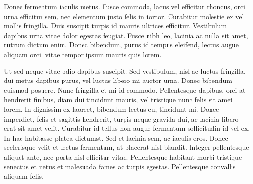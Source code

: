 Donec fermentum iaculis metus. Fusce commodo, lacus vel efficitur rhoncus, orci urna efficitur sem, nec elementum justo felis in tortor. Curabitur molestie ex vel mollis fringilla. Duis suscipit turpis id mauris ultrices efficitur. Vestibulum dapibus urna vitae dolor egestas feugiat. Fusce nibh leo, lacinia ac nulla sit amet, rutrum dictum enim. Donec bibendum, purus id tempus eleifend, lectus augue aliquam orci, vitae tempor ipsum mauris quis lorem.

Ut sed neque vitae odio dapibus suscipit. Sed vestibulum, nisl ac luctus fringilla, dui metus dapibus purus, vel luctus libero mi auctor urna. Donec bibendum euismod posuere. Nunc fringilla et mi id commodo. Pellentesque dapibus, orci at hendrerit finibus, diam dui tincidunt mauris, vel tristique nunc felis sit amet lorem. In dignissim ex laoreet, bibendum lectus eu, tincidunt mi. Donec imperdiet, felis et sagittis hendrerit, turpis neque gravida dui, ac lacinia libero erat sit amet velit. Curabitur id tellus non augue fermentum sollicitudin id vel ex. In hac habitasse platea dictumst. Sed et lacinia sem, ac iaculis eros. Donec scelerisque velit et lectus fermentum, at placerat nisl blandit. Integer pellentesque aliquet ante, nec porta nisl efficitur vitae. Pellentesque habitant morbi tristique senectus et netus et malesuada fames ac turpis egestas. Pellentesque convallis aliquam felis.